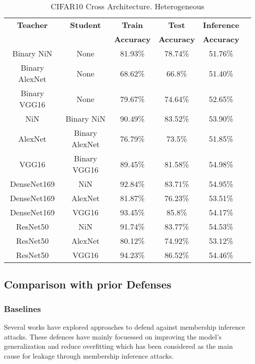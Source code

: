 \begin{table}[!htb]
\begin{center}
\renewcommand\arraystretch{1.5}
\fontsize{6.7pt}{6.7pt}\selectfont
\begin{tabular}{|c|c|c|c|c|c|}
\hline
\textbf{Teacher} & \textbf{Student} & \textbf{Train}  & \textbf{Test}  & \textbf{Inference}  \\
&  & \textbf{Accuracy} & \textbf{Accuracy} & \textbf{Accuracy}  \\
\hline
Binary NiN & None & 81.93\% & 78.74\% & 51.76\% \\
Binary AlexNet & None & 68.62\% & 66.8\% & 51.40\% \\
Binary VGG16 & None & 79.67\% & 74.64\% & 52.65\%\\
\hline
NiN & Binary NiN & 90.49\% & 83.52\% & 53.90\% \\
AlexNet & Binary AlexNet & 76.79\% & 73.5\% & 51.85\% \\
VGG16 & Binary VGG16 & 89.45\% & 81.58\% & 54.98\%\\
\hline
DenseNet169 & NiN & 92.84\% & 83.71\% & 54.95\%\\
DenseNet169 & AlexNet & 81.87\% & 76.23\% & 53.51\%\\
DenseNet169 & VGG16 & 93.45\% & 85.8\% & 54.17\%\\
\hline
ResNet50 & NiN & 91.74\% & 83.77\% & 54.53\% \\
ResNet50 & AlexNet & 80.12\% & 74.92\% & 53.12\%\\
ResNet50 & VGG16 & 94.23\% & 86.52\% & 54.46\%\\
\hline
\end{tabular}
\end{center}
\caption{CIFAR10 Cross Architecture. Heterogeneous}
\label{kd}
\end{table}


\subsection{Comparison with prior Defenses}

\subsubsection{Baselines}

Several works have explored approaches to defend against membership inference attacks.
These defences have mainly focuessed on improving the model's generalization and reduce overfitting which has been considered as the main cause for leakage through membership inference attacks.


